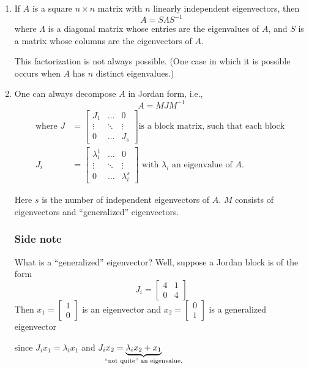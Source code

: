 \begin{enumerate}[label=(\roman*)]
\item If $A$ is a square $n\times n$ matrix with $n$ linearly independent eigenvectors, then
    $$A = S\Lambda S^{-1}$$
    where $\Lambda$ is a diagonal matrix whose entries are the eigenvalues of $A$, and $S$ is a matrix whose columns are the eigenvectors of $A$.
    
    This factorization is not always possible. (One case in which it is possible occurs when $A$ has $n$ distinct eigenvalues.)

\item One can always decompose $A$ in Jordan form, i.e.,
    $$A = MJM^{-1}$$
    \begin{align*}
        \text{where }J &= 
        \begin{bmatrix}
            J_1 & \dots & 0 \\
            \vdots & \ddots & \vdots \\
            0 & \dots & J_s
        \end{bmatrix}
        \text{is a block matrix, such that each block }\\
    J_i &= 
    \begin{bmatrix}
        \lambda_i^1 & \dots & 0 \\
        \vdots & \ddots & \vdots \\
        0 & \dots & \lambda_i^s
    \end{bmatrix}
    \text{ with $\lambda_i$ an eigenvalue of $A$.}
    \end{align*}
    
    Here $s$ is the number of independent eigenvectors of $A$. $M$ consists of eigenvectors and ``generalized'' eigenvectors.
    
    \subsubsection*{Side note}
    
    What is a ``generalized'' eigenvector?
    Well, suppose a Jordan block is of the form 
    \[J_i = \begin{bmatrix}4 & 1 \\ 0 & 4\end{bmatrix} \tag*{($\lambda_i = 4$)} \]
    Then $x_1 = \begin{bmatrix} 1 \\ 0 \end{bmatrix}$ is an eigenvector
    and $x_2 = \begin{bmatrix} 0 \\ 1 \end{bmatrix}$ is a generalized eigenvector
    
    since $J_i x_1 = \lambda_i x_1$ and 
    $J_i x_2 = \underbrace{\lambda_i x_2 + x_1}_{\mathclap{\text{``not quite'' an eigenvalue.}}}$
\end{enumerate}

